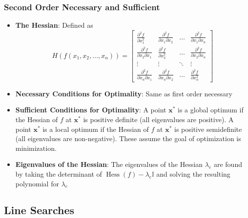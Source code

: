 \documentclass[11pt]{article}
\newcommand{\Item}[1]{\item \textbf{#1}:}
\newcommand{\boldx}{\mathbf{x}}
\newcommand{\xstar}{\boldx^*}
\newcommand{\PPartial}[2]{\frac{\partial^2 #1}{\partial #2^2}}
\newcommand{\PPPartial}[3]{\frac{\partial^2 #1}{\partial #2 \partial #3}}
\DeclareMathOperator{\Hessian}{Hess}
\begin{document}
\subsubsection{Second Order Necessary and Sufficient}
\begin{itemize}
\Item{The Hessian} Defined as
\[H\left(f(x_1,x_2,\dots,x_n)\right) =  \begin{bmatrix}
\PPartial{f}{x_1} & \PPPartial{f}{x_1}{x_2} & \dots & \PPPartial{f}{x_1}{x_n}\\
\PPPartial{f}{x_2}{x_1} & \PPartial{f}{x_2} & \dots & \PPPartial{f}{x_2}{x_n}\\
\vdots & \vdots & \ddots & \vdots\\
\PPPartial{f}{x_n}{x_1} & \PPPartial{f}{x_n}{x_2} & \dots & \PPartial{f}{x_n}
\end{bmatrix}\]
\Item{Necessary Conditions for Optimality} Same as first order necessary
\Item{Sufficient Conditions for Optimality} A point $\xstar$ is a global optimum if the Hessian of $f$ at $\xstar$ is positive definite (all eigenvalues are positive). A point $\xstar$ is a local optimum if the Hessian of $f$ at $\xstar$ is positive semidefinite (all eigenvalues are non-negative). These assume the goal of optimization is minimization.
\Item{Eigenvalues of the Hessian} The eigenvalues of the Hessian $\lambda_e$ are found by taking the determinant of $\Hessian(f)-\lambda_e\mathbb{I}$ and solving the resulting polynomial for $\lambda_e$

\end{itemize}

\subsection{Line Searches}
\end{document}
